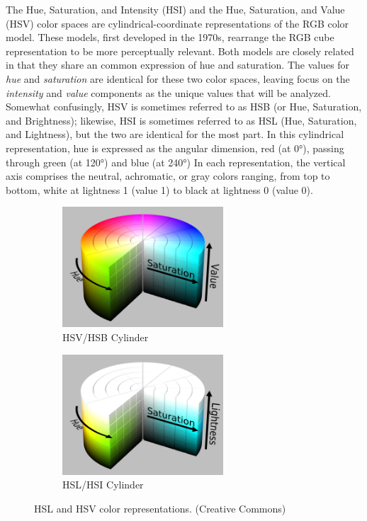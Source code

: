 \documentclass[letterpaper]{report}
\begin{document}
The Hue, Saturation, and Intensity (HSI) and the Hue, Saturation, and Value (HSV) color spaces are cylindrical-coordinate representations of the RGB color model.  These models, first developed in the 1970s, rearrange the RGB cube representation to be more perceptually relevant. Both models are closely related in that they share an common expression of hue and saturation. The values for \textit{hue} and \textit{saturation} are identical for these two color spaces, leaving focus on the \textit{intensity} and \textit{value} components as the unique values that will be analyzed. \parencite[p.~84]{Forsyth2012-hy} Somewhat confusingly, HSV is sometimes referred to as HSB (or Hue, Saturation, and Brightness); likewise, HSI is sometimes referred to as HSL (Hue, Saturation, and Lightness), but the two are identical for the most part. In this cylindrical representation, hue is expressed as the angular dimension, red (at 0\si{\degree}), passing through green (at 120\si{\degree}) and blue (at 240\si{\degree}) In each representation, the vertical axis comprises the neutral, achromatic, or gray colors ranging, from top to bottom, white at lightness 1 (value 1) to black at lightness 0 (value 0).

\begin{figure}[H]
	\centering
	\begin{subfigure}[h]{.45\textwidth}
		\centering
		\includegraphics[width=6cm]{./figures/HSV_color_solid_cylinder_saturation_gray.png}
		\caption{HSV/HSB Cylinder}
		\label{fig:hsv}
	\end{subfigure}
	\hfill
	\begin{subfigure}[h]{.45\textwidth}
		\centering
		\includegraphics[width=6cm]{./figures/HSL_color_solid_cylinder_saturation_gray.png}
		\caption{HSL/HSI Cylinder}
		\label{fig:hsl}
	\end{subfigure}
	\caption[HSL and HSV color representations]{HSL and HSV color representations. (Creative Commons)}
	\label{fig:overlap}
\end{figure}
\end{document}
